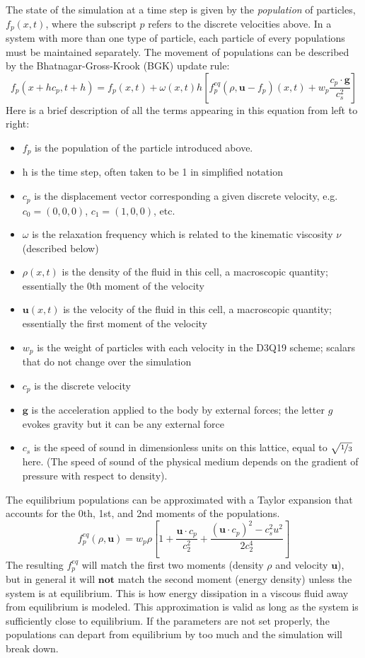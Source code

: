 \documentclass[11pt]{article} %
\renewcommand{\vec}[1]{\mathbf{#1}}
\begin{document}
The state of the simulation at a time step is given by the \textit{population} of particles, 
$f_p(x,t)$, where the subscript $p$ refers to the discrete velocities above.
In a system with more than one type of particle, each particle of every populations must be maintained separately.  
The movement of populations can be described by the Bhatnagar-Gross-Krook (BGK) update rule:
$$f_p(x + hc_p, t + h) = f_p(x,t) + \omega(x,t) h \left[f_p^{eq}(\rho, \vec{u} - f_p)(x,t) + w_p \frac{c_p \cdot \vec{g}}{c_s^2} \right]$$
Here is a brief description of all the terms appearing in this equation from left to right:
\begin{itemize}
\item $f_p$ is the population of the particle introduced above.
\item h is the time step, often taken to be 1 in simplified notation
\item $c_p$ is the displacement vector corresponding a given discrete velocity, e.g. \\
$c_0 = (0,0,0)$,  $c_1 = (1,0,0)$, etc.
\item $\omega$ is the relaxation frequency which is related to the kinematic viscosity $\nu$ (described below)
\item $\rho(x,t)$ is the density of the fluid in this cell, a macroscopic quantity; essentially the 0th moment of the velocity
\item $\vec{u}(x,t)$ is the velocity of the fluid in this cell, a macroscopic quantity; essentially the first moment of the velocity
\item $w_p$ is the weight of particles with each velocity in the D3Q19 scheme; scalars that do not change over the simulation
\item $c_p$ is the discrete velocity
\item $\vec{g}$ is the acceleration applied to the body by external forces; the letter $g$ evokes gravity but it can be any external force
\item $c_s$ is the speed of sound in dimensionless units on this lattice, equal to $\sqrt{\nicefrac{1}{3}}$ here.
(The speed of sound of the physical medium depends on the gradient of pressure with respect to density).
\end{itemize}

The equilibrium populations can be approximated with a Taylor expansion that
accounts for the 0th, 1st, and 2nd moments of the populations.
$$f_p^{eq}(\rho, \vec{u}) = w_p \rho \left[1 + \frac{\vec{u} \cdot c_p}{c_2^2} + \frac{(\vec{u} \cdot c_p)^2 - c_s^2u^2}{2c_2^4} \right] $$
The resulting $f_p^{eq}$ will match the first two moments (density $\rho$ and velocity $\vec{u}$),
but in general it will $\textbf{not}$ match the second moment (energy density) unless the system is at equilibrium.
This is how energy dissipation in a viscous fluid away from equilibrium is modeled.
This approximation is valid as long as the system is sufficiently close to equilibrium.
If the parameters are not set properly, the populations can depart from equilibrium by too much
and the simulation will break down.
\end{document}
